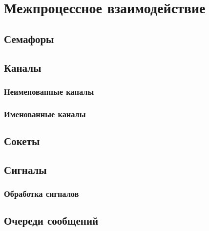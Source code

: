 \documentclass[oneside]{book}
\begin{document}
	\chapter{Межпроцессное взаимодействие}
		
	
		\section{Семафоры}
		

		\section{Каналы}
			
		
			\subsection{Неименованные каналы}
			
			
			\subsection{Именованные каналы}
				

		\section{Сокеты}
		
		
		\section{Сигналы}
		
		
			\subsection{Обработка сигналов}
				
		
		\section{Очереди сообщений}
			
\end{document}

